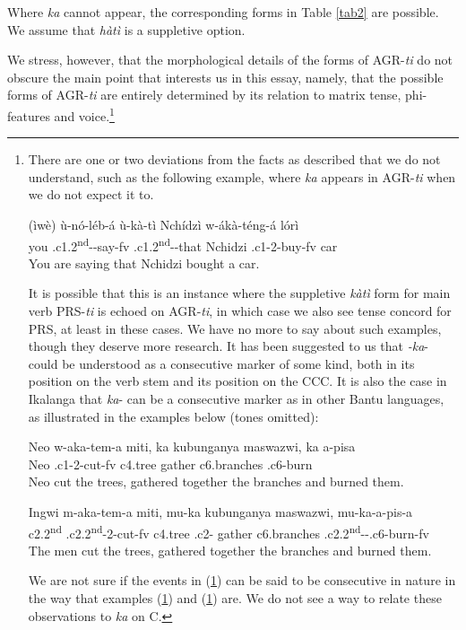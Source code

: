 \documentclass[output=paper,
modfonts
]{langscibook}
\begin{document}
Where \textit{ka} cannot appear, the corresponding forms in Table \ref{tab2} are possible. We assume that \textit{hàtì} is a suppletive option.\largerpage

We stress, however, that the morphological details of the forms of AGR-\textit{ti} do not obscure the main point that interests us in this essay, namely, that the possible forms of AGR-\textit{ti} are entirely determined by its relation to matrix tense, phi-features and voice.\footnote{There are one or two deviations from the facts as described that we do not understand, such as the following example, where \textit{ka} appears in AGR-\textit{ti} when we do not expect it to.

\ea\label{24} \gll (ìwè)	ù-nó-léb-á ù-kà-tì Nchídzì w-ákà-téng-á lórì\\				
you .c1.2\textsuperscript{nd}--say-fv  .c1.2\textsuperscript{nd}--that  Nchidzi .c1-2-buy-fv	car\\ 
	\glt You are saying that Nchidzi bought a car. \z

It is possible that this is an instance where the suppletive \textit{kàtì} form for main verb PRS-\textit{ti} is echoed on AGR-\textit{ti}, in which case we also see tense concord for PRS, at least in these cases. We have no more to say about such examples, though they deserve more research. It has been suggested to us that \textit{-ka}- could be understood as a consecutive marker of some kind, both in its position on the verb stem and its position on the CCC. It is also the case in Ikalanga that \textit{ka}- can be a consecutive marker as in other Bantu languages, as illustrated in the examples below (tones omitted):

\ea\label{FN7.1} \gll Neo w-aka-tem-a miti, ka	kubunganya	maswazwi, ka a-pisa\\
      Neo .c1-2-cut-fv c4.tree  gather c6.branches  .c6-burn\\
      \glt Neo cut the trees, gathered together the branches and burned them.\z
      
 \ea\label{FN7.2}  \gll Ingwi	m-aka-tem-a	miti, mu-ka kubunganya maswazwi, mu-ka-a-pis-a\\
       c2.2\textsuperscript{nd}	.c2.2\textsuperscript{nd}-2-cut-fv	c4.tree	.c2- gather	 c6.branches 			.c2.2\textsuperscript{nd}--.c6-burn-fv\\
	\glt The men cut the trees, gathered together the branches and burned them.  \z

We are not sure if the events in (\ref{24}) can be said to be consecutive in nature in the way that examples (\ref{FN7.1}) and (\ref{FN7.2}) are. We do not see a way to relate these observations to \textit{ka} on C.}
\end{document}
